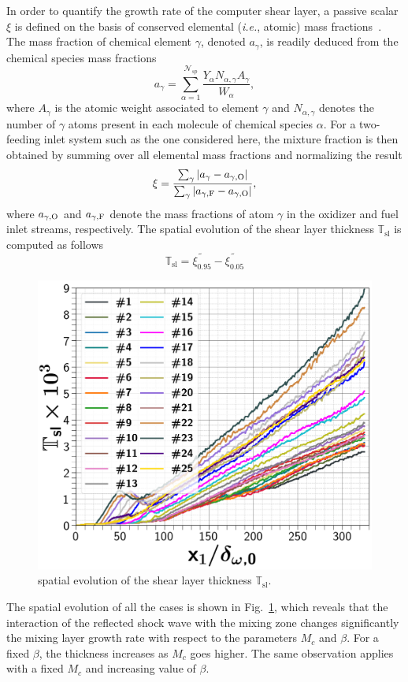 \documentclass[conf]{new-aiaa}
\newcommand{\nspc}{\mathcal{N}_{sp}}
\begin{document}
In order to quantify the growth rate of the computer shear layer, a passive scalar $\xi$ is defined on the basis of conserved elemental (\textit{i.e.}, atomic) mass fractions~\cite{pierce2001progress}.
%
The mass fraction of chemical element $\gamma$, denoted $a_\gamma$, is readily deduced from the chemical species mass fractions
%
\begin{equation}
a_{\gamma} = \sum_{\alpha=1}^{\nspc} \frac{Y_{\alpha} N_{\alpha,\gamma} A_{\gamma}}{W_{\alpha}} ,
\end{equation}
%
where $A_{\gamma}$ is the atomic weight associated to element $\gamma$ and $N_{\alpha,\gamma}$ denotes the number of $\gamma$ atoms present in each molecule of chemical species $\alpha$. For a two-feeding inlet system such as the one considered here, the mixture fraction is then obtained by summing over all elemental mass fractions and normalizing the result
%
\begin{equation}
\xi = \frac{\sum_{\gamma} |a_{\gamma} - a_{\gamma,\ce{O}}|}{\sum_{\gamma} |a_{\gamma,\ce{F}} - a_{\gamma,\ce{O}}|} ,
\label{eq:mixture-variable}
%
\end{equation}
%
where $a_{\gamma,\ce{O}}$ and $a_{\gamma,\ce{F}}$ denote the mass fractions of atom $\gamma$ in the oxidizer and fuel inlet streams, respectively.
%
The spatial evolution of the shear layer thickness $\mathbb{T}_\mathrm{sl}$ is computed as follows
%
\begin{equation}
\mathbb{T}_\mathrm{sl}=\widetilde{\xi_{0.95}}-\widetilde{\xi_{0.05}}
\end{equation}
%
\begin{figure}[!ht]
\centering
\includegraphics[width=0.50\columnwidth]{figs/xievol.png}
\caption{spatial evolution of the shear layer thickness $\mathbb{T}_\mathrm{sl}$.}
\label{fig:tslsh}
\end{figure}
%
The spatial evolution of all the cases is shown in Fig.~\ref{fig:tslsh}, which reveals that the interaction of the reflected shock wave with the mixing zone changes significantly the mixing layer growth rate with respect to the parameters $M_c$ and $\beta$.
%
For a fixed $\beta$, the thickness increases as $M_c$ goes higher. 
%
The same observation applies with a fixed $M_c$ and increasing value of $\beta$.
%
\end{document}
